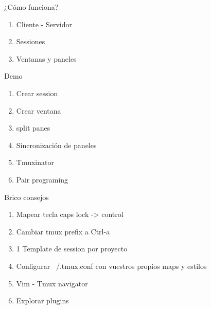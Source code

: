 \documentclass{beamer}
\begin{document}
\begin{frame}{¿Cómo funciona?}
  \begin{enumerate}
  \item Cliente - Servidor
  \item Sessiones
  \item Ventanas y paneles
  \end{enumerate}
\end{frame}

\begin{frame}{Demo}
  \begin{enumerate}
  \item Crear session
  \item Crear ventana
  \item split panes
  \item Sincronización de paneles
  \item Tmuxinator
  \item Pair programing
  \end{enumerate}
\end{frame}

\begin{frame}{Brico consejos}
  \begin{enumerate}
  \item Mapear tecla caps lock -> control
  \item Cambiar tmux prefix a Ctrl-a
  \item 1 Template de session por proyecto
  \item Configurar ~/.tmux.conf con vuestros propios maps y estilos
  \item Vim - Tmux navigator
  \item Explorar plugins
  \end{enumerate}
\end{frame}
\end{document}
